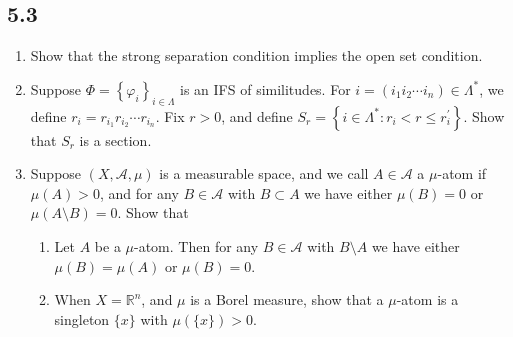 \subsection*{5.3}
\begin{enumerate}
    \item Show that the strong separation condition implies the open set condition.
    \item Suppose $\Phi=\left\{\varphi_{i}\right\}_{i \in \Lambda}$ is an IFS of similitudes. 
    For $i=(i_{1} i_{2} \cdots i_{n}) \in \Lambda^{*}$, 
    we define $r_{i}=r_{i_{1}} r_{i_{2}} \cdots r_{i_{n}}$. 
    Fix $r>0$, and define $S_{r}=\left\{i \in \Lambda^{*}: r_{i}<r \leq r_{i}^{\prime}\right\}$. 
    Show that $S_{r}$ is a section.
    \item Suppose $(X, \mathcal{A}, \mu)$ is a measurable space, 
    and we call $A \in \mathcal{A}$ a $\mu$-atom if $\mu(A)>0$, 
    and for any $B \in \mathcal{A}$ with $B \subset A$ 
    we have either $\mu(B)=0$ or $\mu(A \setminus B)=0$. Show that
    \begin{enumerate}[label=(\roman*)] 
    \item Let $A$ be a $\mu$-atom. 
    Then for any $B \in \mathcal{A}$ with $B \setminus A$ 
    we have either $\mu(B)=\mu(A)$ or $\mu(B)=0$.
    \item When $X=\mathbb{R}^{n}$, and $\mu$ is a Borel measure, 
    show that a $\mu$-atom is a singleton $\{x\}$ with $\mu(\{x\})>0$.
    \end{enumerate}
\end{enumerate}